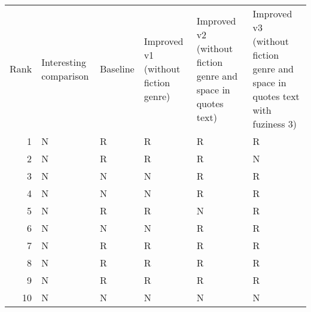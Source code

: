 \begin{tabular}{rlllll}
Rank & Interesting comparison & Baseline & Improved v1 (without fiction genre) & Improved v2 (without fiction genre and space in quotes text) & Improved v3 (without fiction genre and space in quotes text with fuziness 3) \\
1 & N & R & R & R & R \\
2 & N & R & R & R & N \\
3 & N & N & N & R & R \\
4 & N & N & N & R & R \\
5 & N & R & R & N & R \\
6 & N & N & N & R & R \\
7 & N & R & R & R & R \\
8 & N & R & R & R & R \\
9 & N & R & R & R & R \\
10 & N & N & N & N & N \\
\end{tabular}
